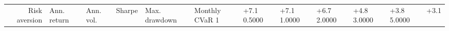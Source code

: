 \begin{tabular}{rlllllll}
\toprule
Risk aversion & Ann. return & Ann. vol. & Sharpe & Max. drawdown & Monthly CVaR 1%
 & +7.1%
0.5000 & +7.1%
1.0000 & +6.7%
2.0000 & +4.8%
3.0000 & +3.8%
5.0000 & +3.1%
\bottomrule
\end{tabular}
